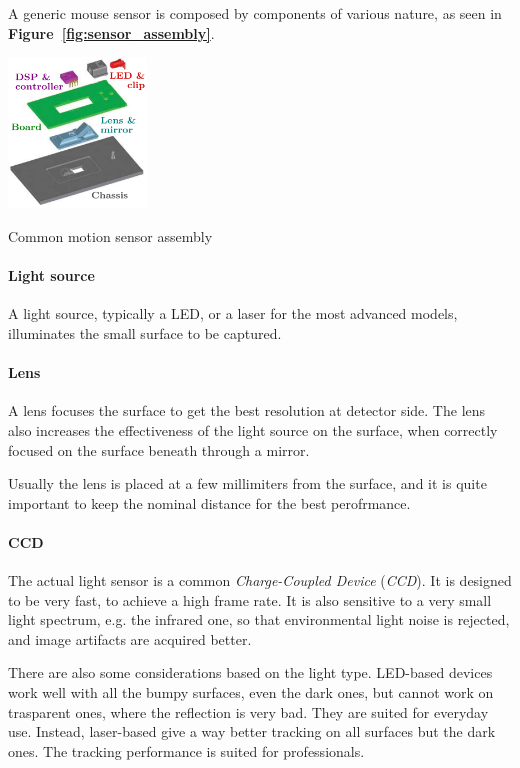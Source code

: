\documentclass[a4paper,10pt]{article}
\makeatletter
\newenvironment{figurehere}{\def\@captype{figure}\vspace{2ex}}{\vspace{2ex}}
\makeatother
\begin{document}
\begin{multicols}{2}
A generic mouse sensor is composed by components of various nature, as seen
in \textbf{Figure~\ref{fig:sensor_assembly}}.

\begin{figurehere}
	\label{fig:sensor_assembly}
	\centering
	\includegraphics[keepaspectratio=true,height=4cm]{images/sensor_assembly.pdf}
	\caption{Common motion sensor assembly}
\end{figurehere}


\paragraph{Light source}
A light source, typically a LED, or a laser for the most advanced models,
illuminates the small surface to be captured.


\paragraph{Lens}
A lens focuses the surface to get the best resolution at detector side.
The lens also increases the effectiveness of the light source on the surface,
when correctly focused on the surface beneath through a mirror.

Usually the lens is placed at a few millimiters from the surface, and
it is quite important to keep the nominal distance for the best perofrmance.


\paragraph{CCD}
The actual light sensor is a common \emph{Charge-Coupled Device}
(\emph{CCD}). It is designed to be very fast, to achieve a high frame rate.
It is also sensitive to a very small light spectrum, e.g. the infrared one,
so that environmental light noise is rejected, and image artifacts are acquired
better.

There are also some considerations based on the light type. LED-based devices
work well with all the bumpy surfaces, even the dark ones, but cannot work
on trasparent ones, where the reflection is very bad. They are suited for
everyday use.
Instead, laser-based give a way better tracking on all surfaces but the dark
ones. The tracking performance is suited for professionals.



\end{multicols}
\end{document}
